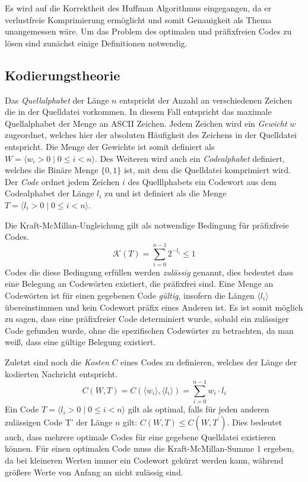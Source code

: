 \documentclass[course=erap]{aspdoc}
\begin{document}
Es wird auf die Korrektheit des Huffman Algorithmus eingegangen, da er verlustfreie Komprimierung ermöglicht und somit Genauigkeit als Thema unangemessen wäre.
Um das Problem des optimalen und präfixfreien Codes zu lösen sind zunächst einige Definitionen notwendig.

\subsection{Kodierungstheorie}

Das \textit{Quellalphabet} der Länge $n$ entspricht der Anzahl an verschiedenen Zeichen die in der Quelldatei vorkommen. In diesem Fall entspricht das maximale Quellalphabet der Menge an ASCII Zeichen.
Jedem Zeichen wird ein \textit{Gewicht} $w$ zugeordnet, welches hier der absoluten Häufigkeit des Zeichens in der Quelldatei entspricht. Die Menge der Gewichte ist somit definiert als $W = \langle w_i > 0 \mid 0 \le i < n \rangle $.
Des Weiteren wird auch ein \textit{Codealphabet} definiert, welches die Binäre Menge $\lbrace0, 1\rbrace$ ist, mit dem die Quelldatei komprimiert wird.
Der \textit{Code} ordnet jedem Zeichen $i$ des Quelllphabets ein Codewort aus dem Codealphabet der Länge $l_i$ zu und ist definiert als die Menge $T = \langle l_i > 0 \mid 0 \le i < n \rangle$.

Die Kraft-McMillan-Ungleichung gilt als notwendige Bedingung für präfixfreie Codes.
$$\mathcal{K}(T) = \sum_{i=0}^{n-1} 2^{-l_i} \le 1$$
Codes die diese Bedingung erfüllen werden \textit{zulässig} genannt, dies bedeutet dass eine Belegung an Codewörten existiert, die präfixfrei sind.
Eine Menge an Codewörten ist für einen gegebenen Code \textit{gültig}, insofern die Längen $\langle l_i \rangle$ übereinstimmen und kein Codewort präfix eines Anderen ist.
Es ist somit möglich zu sagen, dass eine präfixfreier Code determiniert wurde, sobald ein zulässiger Code gefunden wurde, ohne die spezifischen Codewörter zu betrachten, da man weiß, dass eine gültige Belegung existiert.

Zuletzt sind noch die \textit{Kosten} $C$ eines Codes zu definieren, welches der Länge der kodierten Nachricht entspricht.
$$C(W,T) = C(\langle w_i \rangle,\langle l_i \rangle) = \sum_{i=0}^{n-1} w_i \cdot l_i $$
Ein Code $T = \langle l_i > 0 \mid 0 \le i < n \rangle$ gilt als optimal, falls für jeden anderen zulässigen Code T' der Länge $n$ gilt: $C(W,T) \le C(W,T^{\prime})$. Dies bedeutet auch, dass mehrere optimale Codes für eine gegebene Quelldatei existieren können.
Für einen optimalen Code muss die Kraft-McMillan-Summe 1 ergeben, da bei kleineren Werten immer ein Codewort gekürzt werden kann, während größere Werte von Anfang an nicht zulässig sind.
\end{document}
